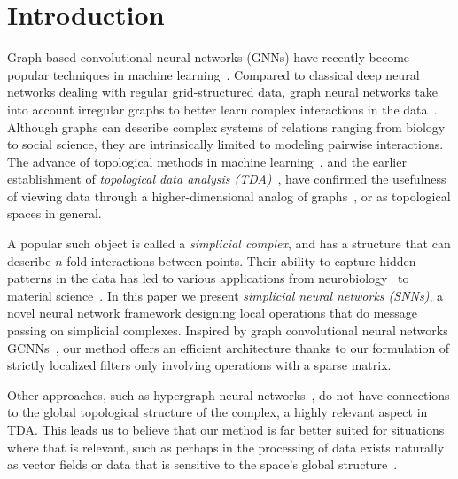 \section{Introduction}



Graph-based convolutional neural networks (GNNs) have recently become popular techniques in machine learning~\cite{defferrard2016convolutional, bronstein2017geometric, wu2020survey}. Compared to classical deep neural networks dealing with regular grid-structured data, graph neural networks take into account irregular graphs to better learn complex interactions in the data~\cite{battaglia2018relational}. Although graphs can describe complex systems of relations ranging from biology to social science, they are intrinsically limited to modeling pairwise interactions. The advance of topological methods in machine learning~\cite{Gabrielsson2020topological, Hofer2019LearningRO, rieck2018neural}, and the earlier establishment of \emph{topological data analysis (TDA)}~\cite{carlsson2008,chazal2017,edelsbrunner2010computational,ghrist2008barcodes}, have confirmed the usefulness of viewing data through a higher-dimensional analog of graphs~\cite{moore2012,patania2017}, or as topological spaces in general. 

A popular such object is called a \emph{simplicial complex}, and has a structure that can describe $n$-fold interactions between points. Their ability to capture hidden patterns in the data has led to various applications from neurobiology~\cite{giusti2015,reimann2017} to material science~\cite{hiraoka2016}. In this paper we present \textit{simplicial neural networks (SNNs)}, a novel neural network framework designing local operations that do message passing on simplicial complexes.
Inspired by graph convolutional neural networks GCNNs~\cite{defferrard2016convolutional}, our method offers an efficient architecture thanks to our formulation of strictly localized filters only involving operations with a sparse matrix.

Other approaches, such as hypergraph neural networks~\cite{feng2018hypergraphs}, do not have connections to the global topological structure of the complex, a highly relevant aspect in TDA. This leads us to believe that our method is far better suited for situations where that is relevant, such as perhaps in the processing of data exists naturally as vector fields or data that is sensitive to the space's global structure~\cite{perraudin2019deepsphere}.


